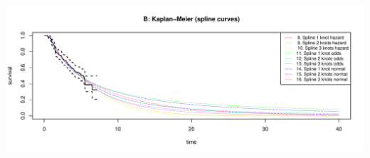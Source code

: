 \documentclass[
]{article}
\begin{document}
\begin{flushleft}\includegraphics[height=0.29\textheight]{Images/validate_extrapolation2-2} \end{flushleft}

\begin{table}


\end{table}
\end{document}
